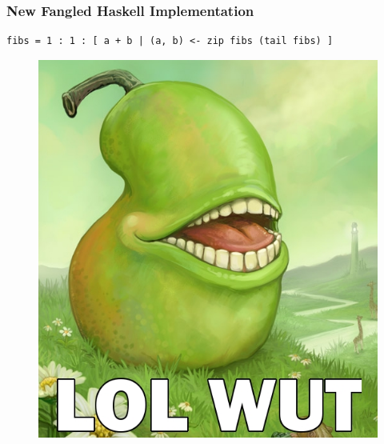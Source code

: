 \documentclass{beamer}
\begin{document}
    \lstset{language=Haskell}
    \begin{frame}[fragile=singleslide]
        \frametitle{New Fangled Haskell Implementation}

        \begin{lstlisting}
fibs = 1 : 1 : [ a + b | (a, b) <- zip fibs (tail fibs) ]
        \end{lstlisting}
    \end{frame}

    \begin{frame}[fragile=singleslide]
        \begin{figure}
            \centering
            \includegraphics[scale=0.35]{./images/lolwutpear.jpg}
        \end{figure}
    \end{frame}
\end{document}
